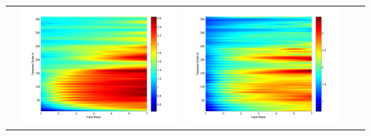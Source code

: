\documentclass[11pt]{article}
\begin{document}
\begin{table}[H]
{\begin{tabular}{ccccc}
&\begin{minipage}{.3\textwidth}\includegraphics[width=\linewidth]{resultgraph/11532500p.png}\end{minipage}
&\begin{minipage}{.3\textwidth}\includegraphics[width=\linewidth]{resultgraph/11532500pep.png}\end{minipage}

\end{tabular}}
\end{table}
\end{document}

